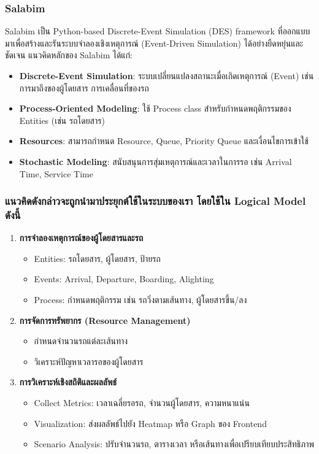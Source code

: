 \subsubsection{Salabim}
Salabim เป็น Python-based Discrete-Event Simulation (DES) framework ที่ออกแบบมาเพื่อสร้างและรันระบบจำลองเชิงเหตุการณ์ (Event-Driven Simulation) ได้อย่างยืดหยุ่นและชัดเจน 
แนวคิดหลักของ Salabim ได้แก่:
\begin{itemize}
    \item \textbf{Discrete-Event Simulation}: ระบบเปลี่ยนแปลงสถานะเมื่อเกิดเหตุการณ์ (Event) เช่น การมาถึงของผู้โดยสาร การเคลื่อนที่ของรถ
    \item \textbf{Process-Oriented Modeling}: ใช้ Process class สำหรับกำหนดพฤติกรรมของ Entities (เช่น รถโดยสาร)
    \item \textbf{Resources}: สามารถกำหนด Resource, Queue, Priority Queue และเงื่อนไขการเข้าใช้
    \item \textbf{Stochastic Modeling}: สนับสนุนการสุ่มเหตุการณ์และเวลาในการรอ เช่น Arrival Time, Service Time
\end{itemize}

\subsubsection{แนวคิดดังกล่าวจะถูกนํามาประยุกต์ใช้ในระบบของเรา โดยใช้ใน Logical Model ดังนี้}
\begin{enumerate}
    \item \textbf{การจำลองเหตุการณ์ของผู้โดยสารและรถ}
    \begin{itemize}
        \item Entities: รถโดยสาร, ผู้โดยสาร, ป้ายรถ
        \item Events: Arrival, Departure, Boarding, Alighting
        \item Process: กำหนดพฤติกรรม เช่น รถวิ่งตามเส้นทาง, ผู้โดยสารขึ้น/ลง
    \end{itemize}
    
    \item \textbf{การจัดการทรัพยากร (Resource Management)}
    \begin{itemize}
        \item กำหนดจำนวนรถแต่ละเส้นทาง
        \item วิเคราะห์ปัญหาเวลารอของผู้โดยสาร
    \end{itemize}
    
    \item \textbf{การวิเคราะห์เชิงสถิติและผลลัพธ์}
    \begin{itemize}
        \item Collect Metrics: เวลาเฉลี่ยรอรถ, จำนวนผู้โดยสาร, ความหนาแน่น
        \item Visualization: ส่งผลลัพธ์ไปยัง Heatmap หรือ Graph ของ Frontend
        \item Scenario Analysis: ปรับจำนวนรถ, ตารางเวลา หรือเส้นทางเพื่อเปรียบเทียบประสิทธิภาพ
    \end{itemize}
\end{enumerate}

